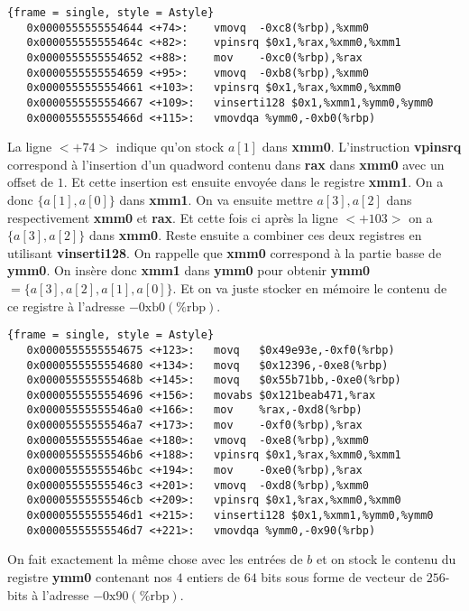 \documentclass[12pt]{article}
\begin{document}
\vspace{1cm}
\begin{lstlisting}{frame = single, style = Astyle}
   0x0000555555554644 <+74>:	vmovq  -0xc8(%rbp),%xmm0
   0x000055555555464c <+82>:	vpinsrq $0x1,%rax,%xmm0,%xmm1
   0x0000555555554652 <+88>:	mov    -0xc0(%rbp),%rax
   0x0000555555554659 <+95>:	vmovq  -0xb8(%rbp),%xmm0
   0x0000555555554661 <+103>:	vpinsrq $0x1,%rax,%xmm0,%xmm0
   0x0000555555554667 <+109>:	vinserti128 $0x1,%xmm1,%ymm0,%ymm0
   0x000055555555466d <+115>:	vmovdqa %ymm0,-0xb0(%rbp)
  \end{lstlisting}
  \vspace{1cm}
 La ligne $<+74>$ indique qu'on stock $a[1]$ dans \textbf{xmm0}. L'instruction \textbf{vpinsrq} correspond à l'insertion d'un quadword contenu dans \textbf{rax} dans \textbf{xmm0} avec un offset de $1$. Et cette insertion est ensuite envoyée dans le registre \textbf{xmm1}. On a donc $\{a[1], a[0]\}$ dans \textbf{xmm1}. On va ensuite mettre $a[3], a[2]$ dans respectivement \textbf{xmm0} et \textbf{rax}. Et cette fois ci après la ligne $<+103>$ on a $\{a[3], a[2]\}$ dans \textbf{xmm0}. Reste ensuite a combiner ces deux registres en utilisant \textbf{vinserti128}. On rappelle que \textbf{xmm0} correspond à la partie basse de \textbf{ymm0}. On insère donc \textbf{xmm1} dans \textbf{ymm0} pour obtenir \textbf{ymm0} $= \{ a[3], a[2], a[1], a[0] \}$. Et on va juste stocker en mémoire le contenu de ce registre à l'adresse $-0\mathrm{xb}0(\%\mathrm{rbp})$.
  \vspace{1cm}
 \begin{lstlisting}{frame = single, style = Astyle}
   0x0000555555554675 <+123>:	movq   $0x49e93e,-0xf0(%rbp)
   0x0000555555554680 <+134>:	movq   $0x12396,-0xe8(%rbp)
   0x000055555555468b <+145>:	movq   $0x55b71bb,-0xe0(%rbp)
   0x0000555555554696 <+156>:	movabs $0x121beab471,%rax
   0x00005555555546a0 <+166>:	mov    %rax,-0xd8(%rbp)
   0x00005555555546a7 <+173>:	mov    -0xf0(%rbp),%rax
   0x00005555555546ae <+180>:	vmovq  -0xe8(%rbp),%xmm0
   0x00005555555546b6 <+188>:	vpinsrq $0x1,%rax,%xmm0,%xmm1
   0x00005555555546bc <+194>:	mov    -0xe0(%rbp),%rax
   0x00005555555546c3 <+201>:	vmovq  -0xd8(%rbp),%xmm0
   0x00005555555546cb <+209>:	vpinsrq $0x1,%rax,%xmm0,%xmm0
   0x00005555555546d1 <+215>:	vinserti128 $0x1,%xmm1,%ymm0,%ymm0
   0x00005555555546d7 <+221>:	vmovdqa %ymm0,-0x90(%rbp)
 \end{lstlisting}
\vspace{1cm}
On fait exactement la même chose avec les entrées de $b$ et on stock le contenu du registre \textbf{ymm0} contenant nos $4$ entiers de $64$ bits sous forme de vecteur de $256$-bits à l'adresse $-0\mathrm{x}90(\%\mathrm{rbp})$.
\end{document}
